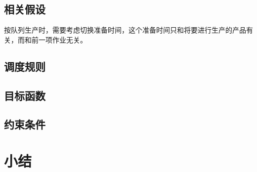 \subsection{相关假设}
按队列生产时，需要考虑切换准备时间，这个准备时间只和将要进行生产的产品有关，而和前一项作业无关。

\subsection{调度规则}

\subsection{目标函数}

\subsection{约束条件}


\section{小结}